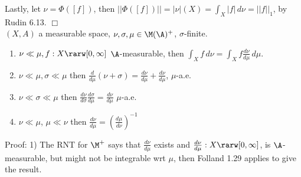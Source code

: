 \noindent
Lastly, let $ \nu = \Phi([f])$, then $||\Phi([f])|| = |\nu|(X) = \int_X |f| \, d\nu = ||f||_1$, by Rudin 6.13. $\Box$ \\






$(X, A)$ a measurable space, $\nu,\sigma,\mu \in \M(\A)^+$, $\sigma$-finite.

\begin{enumerate}
\item
$\nu \ll \mu, f: X \rarw [0,\infty]$ $\A$-measurable, then $\int_X f \, d\nu = \int_X f \frac{d\nu}{d\mu} \, d\mu$.
\item
$\nu \ll \mu, \sigma \ll \mu$ then $\frac{d}{d\mu}( \nu + \sigma ) = \frac{d\nu}{d\mu} +  \frac{d\nu}{d\mu}$, $\mu$-a.e.
\item
$\nu \ll \sigma \ll \mu$ then $\frac{d\nu}{d\sigma}\frac{d\sigma}{d\mu} = \frac{d\nu}{d\mu}$ $\mu$-a.e.
\item
$\nu \ll \mu$, $\mu \ll \nu$ then $\frac{d\nu}{d\mu} = \left( \frac{d\mu}{d\nu} \right)^{-1} $
\end{enumerate}

\noindent
Proof: 1) The RNT for $\M^+$ says that $\frac{d\nu}{d\mu}$ exists and $\frac{d\nu}{d\mu}: X \rarw [0,\infty]$, is $\A$-measurable, but might not be integrable wrt $\mu$, then Folland 1.29 applies to give the result. \\


